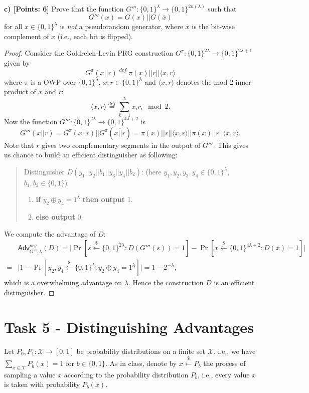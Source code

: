 \documentclass[12pt]{article}
\newcommand{\eqdef}{\stackrel{def}{=}}
\newcommand{\bits}{\{0,1\}}
\newcommand{\getsr}{\stackrel{\$}{\gets}}
\newcommand{\angles}[1]{\langle #1 \rangle}
\newcommand{\Adv}{\textsf{Adv}}
\theoremstyle{definition}
\begin{document}
{\bf c) [Points: 6]} Prove that the function $G''' : \bits^{\lambda} \to \bits^{2n(\lambda)}$ such that
$$G'''(x) = G(x)||G(\overline{x})$$
for all $x\in\bits^\lambda$ is \emph{not} a pseudorandom generator, where $\overline{x}$ is the bit-wise complement of $x$ (i.e., each bit is flipped).
\begin{proof}
Consider the Goldreich-Levin PRG construction $G^\pi : \bits^{2\lambda} \to \bits^{2\lambda+1}$ given by
$$G^\pi(x||r) \eqdef \pi(x)||r||\angles{x,r}$$
where $\pi$ is a OWP over $\bits^\lambda$, $x,r \in \bits^\lambda$ and $\angles{x,r}$ denotes the mod 2 inner product of $x$ and $r$:
$$\angles{x,r} \eqdef \sum_{k=1}^\lambda x_ir_i\mod 2.$$
Now the function $G''' : \bits^{2\lambda} \to \bits^{4\lambda+2}$ is
$$G'''(x||r) = G^\pi(x||r)||G^\pi(\overline{x||r}) = \pi(x)||r||\angles{x,r}||\pi(\overline{x})||\overline{r}||\angles{\overline{x},\overline{r}}.$$
Note that $r$ gives two complementary segments in the output of $G'''$. This gives us chance to build an efficient distinguisher as following:
\begin{quote}
Distinguisher $D(y_1||y_2||b_1||y_3||y_4||b_2)$: (here $y_1,y_2,y_3,y_4 \in \bits^\lambda$, $b_1,b_2\in\bits$)
\begin{enumerate}
\item {\bf if} $y_2 \oplus y_4 = 1^\lambda$ {\bf then output} 1.
\item {\bf else output} 0.
\end{enumerate}
\end{quote}
We compute the advantage of $D$:
$$
\begin{aligned}
&\Adv_{G''',\lambda}^{prg}(D) = \bigg| \Pr[s\getsr \bits^{2\lambda}: D(G'''(s))=1] - \Pr[x\getsr \bits^{4\lambda+2}: D(x)=1] \bigg| \\
=& \bigg| 1 - \Pr[y_2,y_4 \getsr\bits^\lambda: y_2 \oplus y_4 = 1^\lambda] \bigg| = 1 - 2^{-\lambda},
\end{aligned}
$$
which is a overwhelming advantage on $\lambda$. Hence the construction $D$ is an efficient distinguisher.
\end{proof}


\section{Task 5 - Distinguishing Advantages}
Let $P_0, P_1 : \mathcal{X} \to [0,1]$ be probability distributions on a finite set $\mathcal{X}$, i.e., we have $\sum_{x\in\mathcal{X}}P_b(x) = 1$ for $b\in\bits$. As in class, denote by $x\getsr P_b$ the process of sampling a value $x$ according to the probability distribution $P_b$, i.e., every value $x$ is taken with probability $P_b(x)$.
\end{document}
